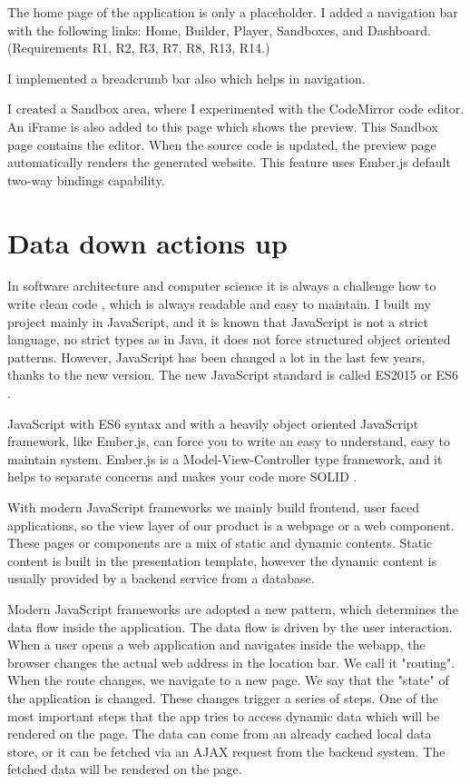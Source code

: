 \documentclass[11pt, a4paper, oneside, openright, medskipamount]{report}
\begin{document}
The home page of the application is only a placeholder. I added a navigation bar with the following links: Home, Builder, Player, Sandboxes, and Dashboard. (Requirements R1, R2, R3, R7, R8, R13, R14.)

I implemented a breadcrumb bar also which helps in navigation.

I created a Sandbox area, where I experimented with the CodeMirror code editor. An iFrame is also added to this page which shows the preview. This Sandbox page contains the editor. When the source code is updated, the preview page automatically renders the generated website. This feature uses Ember.js default two-way bindings capability.

\section{Data down actions up}

In software architecture and computer science it is always a challenge how to write clean code \cite{clean-code}, which is always readable and easy to maintain. I built my project mainly in JavaScript, and it is known that JavaScript is not a strict language, no strict types as in Java, it does not force structured object oriented patterns. However, JavaScript has been changed a lot in the last few years, thanks to the new version. The new JavaScript standard is called ES2015 or ES6 \cite{es6}.

JavaScript with ES6 syntax and with a heavily object oriented JavaScript framework, like Ember.js, can force you to write an easy to understand, easy to maintain system. Ember.js is a Model-View-Controller type framework, and it helps to separate concerns and makes your code more SOLID \cite{solid}.

With modern JavaScript frameworks we mainly build frontend, user faced applications, so the view layer of our product is a webpage or a web component. These pages or components are a mix of static and dynamic contents. Static content is built in the presentation template, however the dynamic content is usually provided by a backend service from a database.

Modern JavaScript frameworks are adopted a new pattern, which determines the data flow inside the application. The data flow is driven by the user interaction. When a user opens a web application and navigates inside the webapp, the browser changes the actual web address in the location bar. We call it "routing". When the route changes, we navigate to a new page. We say that the "state" of the application is changed. These changes trigger a series of steps. One of the most important steps that the app tries to access dynamic data which will be rendered on the page. The data can come from an already cached local data store, or it can be fetched via an AJAX request from the backend system. The fetched data will be rendered on the page.
\end{document}
